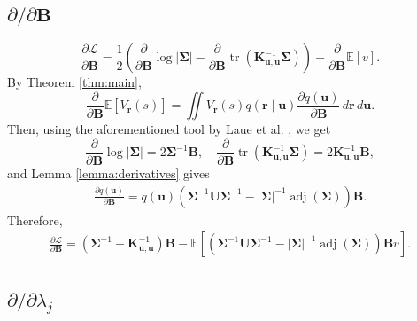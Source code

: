\documentclass{mpaper}
\DeclareMathOperator{\adj}{adj}
\DeclareMathOperator{\tr}{tr}
\newcommand{\V}{V_{\mathbf{r}}}
\newcommand{\dx}{\,d\mathbf{r}\,d\mathbf{u}}
\newcommand{\Kuu}{\mathbf{K}_{\mathbf{u},\mathbf{u}}}
\newcommand{\dB}{\frac{\partial}{\partial\mathbf{B}}}
\begin{document}
\subsection{\texorpdfstring{$\partial/\partial\mathbf{B}$}{Derivative w.r.t. B}}

\[
  \frac{\partial\mathcal{L}}{\partial\mathbf{B}} =
  \frac{1}{2} \left( \dB\log|\bm\Sigma| - \dB\tr \left( \Kuu^{-1} \bm\Sigma
    \right) \right)
  - \dB\mathbb{E}[v].
\]
By Theorem \ref{thm:main},
\[
  \dB\mathbb{E}[\V(s)] = \iint \V(s) q(\mathbf{r} \mid \mathbf{u})
  \frac{\partial q(\mathbf{u})}{\partial \mathbf{B}}\dx.
\]
Then, using the aforementioned tool by Laue et al.
\cite{DBLP:conf/nips/LaueMG18}, we get
\[
  \dB\log|\bm\Sigma| = 2\bm\Sigma^{-1}\mathbf{B}, \quad \dB \tr \left( \Kuu^{-1}
    \bm\Sigma \right) = 2\Kuu^{-1}\mathbf{B},
\]
and Lemma \ref{lemma:derivatives} gives
\begin{gather*}
  \frac{\partial q(\mathbf{u})}{\partial \mathbf{B}} =
  q(\mathbf{u})(\bm\Sigma^{-1}\mathbf{U}\bm\Sigma^{-1} -
  |\bm\Sigma|^{-1}\adj(\bm\Sigma))\mathbf{B}.
\end{gather*}
Therefore,
\begin{gather*}
  \frac{\partial \mathcal{L}}{\partial \mathbf{B}} =
  \left( \bm\Sigma^{-1} - \Kuu^{-1} \right) \mathbf{B} - \mathbb{E}
  [(\bm\Sigma^{-1}\mathbf{U}\bm\Sigma^{-1} -
  |\bm\Sigma|^{-1}\adj(\bm\Sigma))\mathbf{B}v].
\end{gather*}

\subsection{\texorpdfstring{$\partial/\partial \lambda_j$}{Derivative w.r.t.
    Lambda}}
\end{document}
